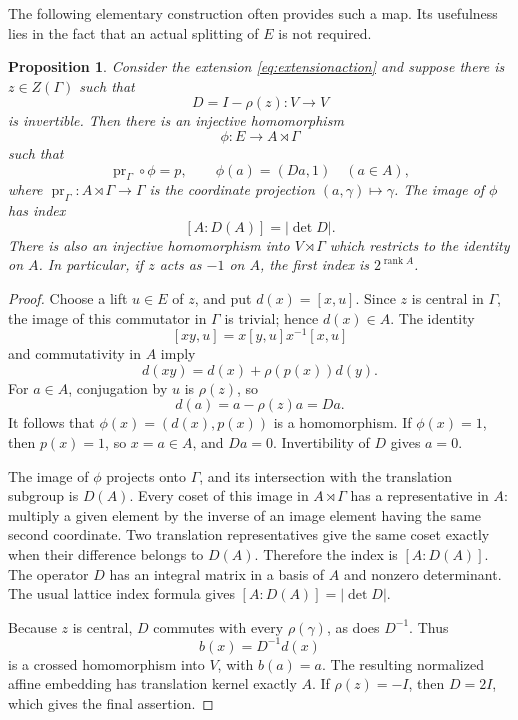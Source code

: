 \documentclass[11pt,a4paper]{article}
\newtheorem{proposition}[theorem]{Proposition}
\theoremstyle{definition}
\begin{document}
The following elementary construction often provides such a map.
Its usefulness lies in the fact that an actual splitting of \(E\) is not required.

\begin{proposition}\label{prop:centralaffine}
Consider the extension \eqref{eq:extensionaction} and suppose there is \(z\in Z(\Gamma)\)
such that
\[
 D=I-\rho(z):V\longrightarrow V
\]
is invertible. Then there is an injective homomorphism
\[
 \phi:E\longrightarrow A\rtimes\Gamma
\]
such that
\[
 \operatorname{pr}_{\Gamma}\circ\phi=p,
 \qquad \phi(a)=(Da,1)\quad(a\in A),
\]
where \(\operatorname{pr}_{\Gamma}:A\rtimes\Gamma\to\Gamma\)
is the coordinate projection \((a,\gamma)\mapsto\gamma\).
The image of \(\phi\) has index
\[
 [A:D(A)]=|\det D|.
\]
There is also an injective homomorphism into
\(V\rtimes\Gamma\) which restricts to the identity on \(A\).
In particular, if \(z\) acts as \(-1\) on \(A\), the first
index is \(2^{\operatorname{rank}A}\).
\end{proposition}
\begin{proof}
Choose a lift \(u\in E\) of \(z\), and put
\(d(x)=[x,u]\). Since \(z\) is central in \(\Gamma\),
the image of this commutator in \(\Gamma\) is trivial;
hence \(d(x)\in A\). The identity
\[
 [xy,u]=x[y,u]x^{-1}[x,u]
\]
and commutativity in \(A\) imply
\[
 d(xy)=d(x)+\rho(p(x))d(y).
\]
For \(a\in A\), conjugation by \(u\) is \(\rho(z)\), so
\[
 d(a)=a-\rho(z)a=Da.
\]
It follows that \(\phi(x)=(d(x),p(x))\) is a homomorphism.
If \(\phi(x)=1\), then \(p(x)=1\), so \(x=a\in A\),
and \(Da=0\). Invertibility of \(D\) gives \(a=0\).

The image of \(\phi\) projects onto \(\Gamma\), and its
intersection with the translation subgroup is \(D(A)\).
Every coset of this image in \(A\rtimes\Gamma\) has a
representative in \(A\): multiply a given element by the
inverse of an image element having the same second coordinate.
Two translation representatives give the same coset exactly
when their difference belongs to \(D(A)\).
Therefore the index is \([A:D(A)]\).
The operator \(D\) has an integral matrix in a basis of \(A\)
and nonzero determinant. The usual lattice index formula gives
\([A:D(A)]=|\det D|\).

Because \(z\) is central, \(D\) commutes with every
\(\rho(\gamma)\), as does \(D^{-1}\). Thus
\[
 b(x)=D^{-1}d(x)
\]
is a crossed homomorphism into \(V\), with \(b(a)=a\).
The resulting normalized affine embedding has translation
kernel exactly \(A\). If \(\rho(z)=-I\), then \(D=2I\),
which gives the final assertion.
\end{proof}
\end{document}
